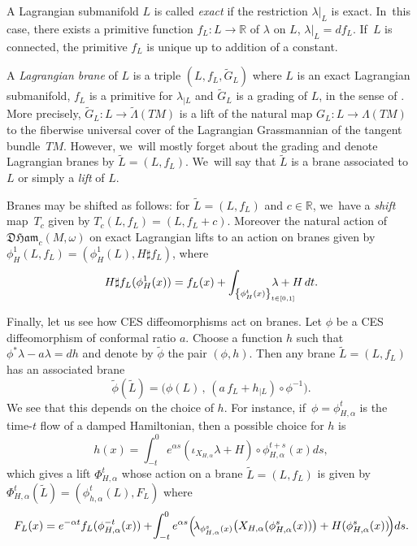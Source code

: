 \documentclass[10pt]{amsart}
\theoremstyle{definition}
\newcommand{\R}{\mathbb{R}}
\newcommand{\DHam}{\mathfrak{DHam}}
\begin{document}
A Lagrangian submanifold $L$ is called \emph{exact} if the restriction $\lambda|_L$ is exact. In~this case, there exists a primitive function $f_L:L\to\R$ of $\lambda$ on $L$, \ie $\lambda|_L=df_L$. If~$L$ is connected, the primitive $f_L$ is unique up to addition of a constant.

A \emph{Lagrangian brane} of $L$ is a triple $(L,f_L,\tilde{G}_L)$ where $L$ is an exact Lagrangian submanifold, $f_L$ is a primitive for $\lambda_{\mid L}$ and $\tilde{G}_L$ is a grading of $L$, in the sense of \cite{Seidel-graded}. More precisely, $\tilde{G}_L:L\to\tilde{\Lambda}(TM)$ is a lift of the natural map $G_L:L\to\Lambda(TM)$ to the fiberwise universal cover of the Lagrangian Grassmannian of the tangent bundle~$TM$. However, we~will mostly forget about the grading and denote Lagrangian branes by $\tilde L=(L,f_L)$. We~will say that $\tilde L$ is a brane associated to $L$ or simply a \emph{lift} of $L$.

Branes may be shifted as follows: for $\tilde L=(L,f_L)$ and $c\in\R$, we~have a \emph{shift} map~$T_c$ given by $T_c(L, f_L)= (L, f_L+c)$. Moreover the natural action of $\DHam_c(M,\omega)$ on exact Lagrangian lifts to an action on branes given by $\phi_H^1(L, f_L)=(\phi_H^1(L), H\sharp f_L)$, where
\begin{equation}
H\sharp f_L(\phi_H^1(x))=f_L(x)+\int_{\left\{\phi_H^t(x)\right\}_{t\in[0,1]}}\hspace*{-.8cm}\lambda+H\,dt.\label{eq:Ham-action-on-primitive}
\end{equation}

Finally, let us see how CES diffeomorphisms act on branes.
Let $\phi$ be a CES diffeomorphism of conformal ratio $a$. Choose a function $h$ such that $\phi^*\lambda-a\lambda=dh$ and denote by $\tilde \phi$ the pair $(\phi, h)$. Then any brane $\tilde L=(L,f_L)$ has an associated brane
\begin{equation}\label{eq:CES-on-brane}
\tilde \phi(\tilde L)=\bigl(\phi(L)\,,\, (a\,f_L+h_{\mid L})\circ\phi^{-1}\bigr).
\end{equation}
We see that this depends on the choice of $h$. For instance, if~$\phi=\phi_{H,\alpha}^t$ is the time-$t$ flow of a damped Hamiltonian, then a possible choice for $h$ is
\begin{equation}
\label{eq:conf-Ham-h}
h(x)=\int_{-t}^0e^{\alpha s}(\iota_{ X_{H,\alpha}}\lambda + H)\circ \phi_{H,\alpha}^{t+s}(x)ds,
\end{equation}
which gives a lift $\Phi_{H,\alpha}^t$ whose action on a brane $\tilde L=(L,f_L)$ is given by $\Phi_{H,\alpha}^t(\tilde L)=(\phi_{h,\alpha}^t(L),F_L)$ where
\begin{equation}\label{eq:conf-Ham-on-brane}
F_L(x)=e^{-\alpha t}f_L(\phi^{-t}_{H, \alpha}(x))+\!\int_{-t}^0e^{\alpha s}\Bigl(\!\lambda_{\phi^s_{H, \alpha}(x)}\bigl(X_{H, \alpha}(\phi_{H, \alpha}^s(x))\bigr)+H(\phi^s_{H, \alpha}(x))\!\Bigr)ds.
\end{equation}
\end{document}
